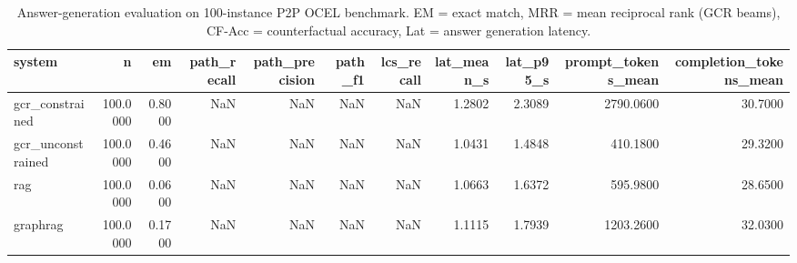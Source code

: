 \begin{table}
\caption{Answer-generation evaluation on 100-instance P2P OCEL benchmark. EM = exact match, MRR = mean reciprocal rank (GCR beams), CF-Acc = counterfactual accuracy, Lat = answer generation latency.}
\label{tab:answer_results}
\begin{tabular}{lrrrrrrrrrr}
\toprule
system & n & em & path_recall & path_precision & path_f1 & lcs_recall & lat_mean_s & lat_p95_s & prompt_tokens_mean & completion_tokens_mean \\
\midrule
gcr_constrained & 100.0000 & 0.8000 & NaN & NaN & NaN & NaN & 1.2802 & 2.3089 & 2790.0600 & 30.7000 \\
gcr_unconstrained & 100.0000 & 0.4600 & NaN & NaN & NaN & NaN & 1.0431 & 1.4848 & 410.1800 & 29.3200 \\
rag & 100.0000 & 0.0600 & NaN & NaN & NaN & NaN & 1.0663 & 1.6372 & 595.9800 & 28.6500 \\
graphrag & 100.0000 & 0.1700 & NaN & NaN & NaN & NaN & 1.1115 & 1.7939 & 1203.2600 & 32.0300 \\
\bottomrule
\end{tabular}
\end{table}
